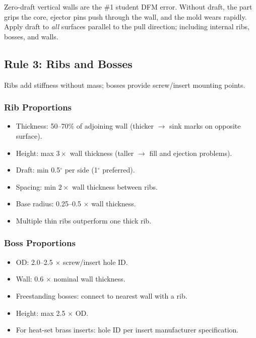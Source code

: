 \documentclass[11pt,letterpaper,twoside,openany]{book}
\providecommand{\ang}[1]{#1\ensuremath{{}^{\circ}}}
\begin{document}
\begin{warningbox}[Zero-Draft = Stuck Parts]
Zero-draft vertical walls are the \#1 student DFM error. Without draft, the part grips the core, ejector pins push through the wall, and the mold wears rapidly. Apply draft to \emph{all} surfaces parallel to the pull direction; including internal ribs, bosses, and walls.
\end{warningbox}

\subsection{Rule 3: Ribs and Bosses}

Ribs add stiffness without mass; bosses provide screw/insert mounting points.

\subsubsection{Rib Proportions}
\begin{itemize}[nosep,leftmargin=1.5em]
  \item Thickness: 50--70\% of adjoining wall (thicker $\to$ sink marks on opposite surface).
  \item Height: max $3\times$ wall thickness (taller $\to$ fill and ejection problems).
  \item Draft: min \ang{0.5} per side (\ang{1} preferred).
  \item Spacing: min $2\times$ wall thickness between ribs.
  \item Base radius: 0.25--0.5 $\times$ wall thickness.
  \item Multiple thin ribs outperform one thick rib.
\end{itemize}

\subsubsection{Boss Proportions}
\begin{itemize}[nosep,leftmargin=1.5em]
  \item OD: 2.0--2.5 $\times$ screw/insert hole ID.
  \item Wall: 0.6 $\times$ nominal wall thickness.
  \item Freestanding bosses: connect to nearest wall with a rib.
  \item Height: max 2.5 $\times$ OD.
  \item For heat-set brass inserts: hole ID per insert manufacturer specification.
\end{itemize}
\end{document}
